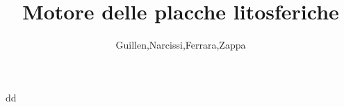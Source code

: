 \documentclass{article}
\author{Guillen,Narcissi,Ferrara,Zappa}
\title{Motore delle placche litosferiche}
\begin{document}
dd
\end{document}
